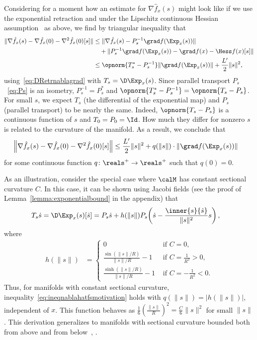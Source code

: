 Considering for a moment how an estimate for $\nabla \hat f_x(s)$ might look like if we use the exponential retraction and under the Lipschitz continuous Hessian assumption~ as above, we find by triangular inequality that
\begin{align*}
	\|\nabla \hat f_x(s) - \nabla \hat f_x(0) - \nabla^2 \hat f_x(0)[s]\| &
	\leq \|\nabla \hat f_x(s) - P_s^{-1} \grad f(\Exp_x(s))\| \\ & \quad + \|P_s^{-1} \grad f(\Exp_x(s)) - \grad f(x) - \Hess f(x)[s]\| \\
	& \leq \opnorm{T_s^* - P_s^{-1}} \|\grad f(\Exp_x(s))\| + \frac{L'}{2} \|s\|^2,
\end{align*}
using~\eqref{eq:DRetrnablagrad} with $T_s = \D\Exp_x(s)$.
Since parallel transport $P_s$~\eqref{eq:Ps} is an isometry, $P_s^{-1} = P_s^*$ and $\opnorm{T_s^* - P_s^{-1}} = \opnorm{T_s - P_s}$.
For small $s$, we expect $T_s$ (the differential of the exponential map) and $P_s$ (parallel transport) to be nearly the same. Indeed, $\opnorm{T_s - P_s}$ is a continuous function of $s$ and $T_0 = P_0 = \Id$. How much they differ for nonzero $s$ is related to the curvature of the manifold. As a result, we conclude that
\begin{align}
	\left\| \nabla \hat f_x(s) - \nabla \hat f_x(0) - \nabla^2 \hat f_x(0)[s] \right\| & \leq \frac{L'}{2} \|s\|^2 + q(\|s\|) \cdot \|\grad f(\Exp_x(s))\|
	\label{eq:ineqnablahatfsmotivation}
\end{align}
for some continuous function $q \colon \reals^+ \to \reals^+$ such that $q(0) = 0$. %

As an illustration, consider the special case where $\calM$ has constant sectional curvature $C$. In this case, it can be shown using Jacobi fields (see the proof of Lemma~\ref{lemma:exponentialbound} in the appendix) that
\begin{align}
	T_s \dot s & = \D \Exp_x(s)[\dot s] = P_s \dot s + h(\|s\|) P_s\!\left(\dot s - \frac{\inner{s}{\dot s}}{\|s\|^2} s\right),
	\label{eq:DExpConstantCurvature}
\end{align}
where
\begin{align*}
	h(\|s\|) & = \begin{cases}
			0 & \textrm{ if } C = 0, \\
			\frac{\sin(\|s\|/R)}{\|s\|/R} - 1 & \textrm{ if } C = \frac{1}{R^2} > 0, \\
			\frac{\sinh(\|s\|/R)}{\|s\|/R} - 1 & \textrm{ if } C = -\frac{1}{R^2} < 0.
		\end{cases}
\end{align*}
Thus, for manifolds with constant sectional curvature, inequality~\eqref{eq:ineqnablahatfsmotivation} holds with $q(\|s\|) = |h(\|s\|)|$, independent of $x$. This function behaves as $\frac{1}{6}\!\left(\frac{\|s\|}{R}\right)^2 = \frac{C}{6} \|s\|^2$ for small $\|s\|$. This derivation generalizes to manifolds with sectional curvature bounded both from above and from below~\citep{tripuraneni2018averaging}, \citep[Thm.~A.2.9]{waldmann2012geometric}.

